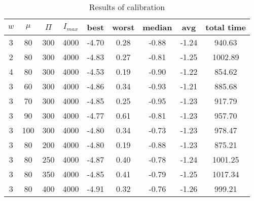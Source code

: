 \begin{table}[!h]
\centering
\begin{tabular}{@{}ccccccccc@{}}
\toprule
$w$ & $\mu$ & $\Pi$ & $I_{max}$ & best  & worst & median & avg   & total time \\ \midrule
3   & 80    & 300   & 4000    & -4.70 & 0.28  & -0.88  & -1.24 & 940.63     \\
2   & 80    & 300   & 4000    & -4.83 & 0.27  & -0.81  & -1.25 & 1002.89    \\
4   & 80    & 300   & 4000    & -4.53 & 0.19  & -0.90  & -1.22 & 854.62     \\
3   & 60    & 300   & 4000    & -4.86 & 0.34  & -0.93  & -1.21 & 885.68     \\
3   & 70    & 300   & 4000    & -4.85 & 0.25  & -0.95  & -1.23 & 917.79     \\
3   & 90    & 300   & 4000    & -4.77 & 0.61  & -0.81  & -1.23 & 957.70     \\
3   & 100   & 300   & 4000    & -4.80 & 0.34  & -0.73  & -1.23 & 978.47     \\
3   & 80    & 200   & 4000    & -4.80 & 0.19  & -0.88  & -1.23 & 875.21     \\
3   & 80    & 250   & 4000    & -4.87 & 0.40  & -0.78  & -1.24 & 1001.25    \\
3   & 80    & 350   & 4000    & -4.85 & 0.41  & -0.79  & -1.25 & 1017.34    \\
3   & 80    & 400   & 4000    & -4.91 & 0.32  & -0.76  & -1.26 & 999.21     \\
\bottomrule
\end{tabular}
\caption{Results of calibration}
\label{calibration-results}
\end{table}